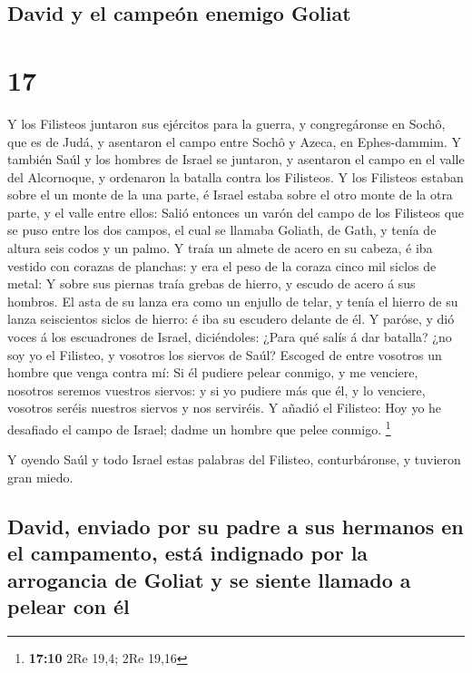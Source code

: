 \hypertarget{david-y-el-campeuxf3n-enemigo-goliat}{%
\subsection{David y el campeón enemigo
Goliat}\label{david-y-el-campeuxf3n-enemigo-goliat}}

\hypertarget{section-16}{%
\section{17}\label{section-16}}

 Y los Filisteos juntaron sus ejércitos para la guerra, y
congregáronse en Sochô, que es de Judá, y asentaron el campo entre Sochô
y Azeca, en Ephes-dammim.  Y también Saúl y los hombres de
Israel se juntaron, y asentaron el campo en el valle del Alcornoque, y
ordenaron la batalla contra los Filisteos.  Y los Filisteos
estaban sobre el un monte de la una parte, é Israel estaba sobre el otro
monte de la otra parte, y el valle entre ellos:  Salió
entonces un varón del campo de los Filisteos que se puso entre los dos
campos, el cual se llamaba Goliath, de Gath, y tenía de altura seis
codos y un palmo.  Y traía un almete de acero en su cabeza,
é iba vestido con corazas de planchas: y era el peso de la coraza cinco
mil siclos de metal:  Y sobre sus piernas traía grebas de
hierro, y escudo de acero á sus hombros.  El asta de su
lanza era como un enjullo de telar, y tenía el hierro de su lanza
seiscientos siclos de hierro: é iba su escudero delante de él.
 Y paróse, y dió voces á los escuadrones de Israel,
diciéndoles: ¿Para qué salís á dar batalla? ¿no soy yo el Filisteo, y
vosotros los siervos de Saúl? Escoged de entre vosotros un hombre que
venga contra mí:  Si él pudiere pelear conmigo, y me
venciere, nosotros seremos vuestros siervos: y si yo pudiere más que él,
y lo venciere, vosotros seréis nuestros siervos y nos serviréis.
 Y añadió el Filisteo: Hoy yo he desafiado el campo de
Israel; dadme un hombre que pelee conmigo. \footnote{\textbf{17:10} 2Re
  19,4; 2Re 19,16}

 Y oyendo Saúl y todo Israel estas palabras del Filisteo,
conturbáronse, y tuvieron gran miedo.

\hypertarget{david-enviado-por-su-padre-a-sus-hermanos-en-el-campamento-estuxe1-indignado-por-la-arrogancia-de-goliat-y-se-siente-llamado-a-pelear-con-uxe9l}{%
\subsection{David, enviado por su padre a sus hermanos en el campamento,
está indignado por la arrogancia de Goliat y se siente llamado a pelear
con
él}\label{david-enviado-por-su-padre-a-sus-hermanos-en-el-campamento-estuxe1-indignado-por-la-arrogancia-de-goliat-y-se-siente-llamado-a-pelear-con-uxe9l}}

